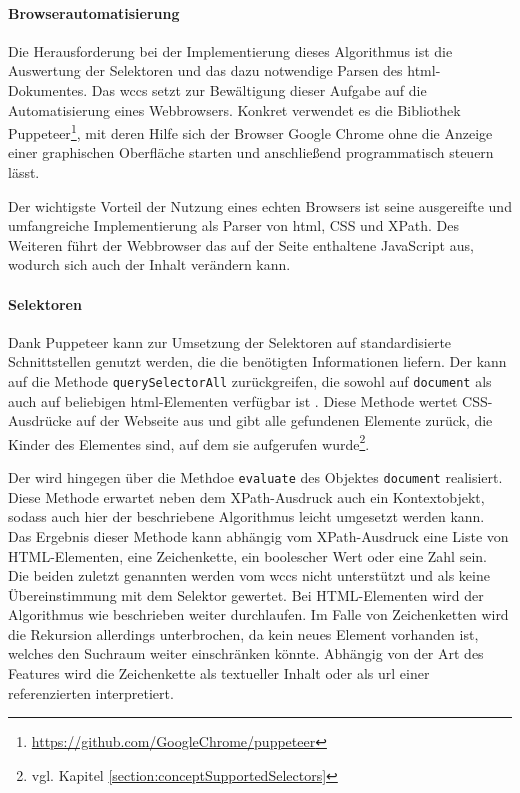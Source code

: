     \paragraph{Browserautomatisierung}
    Die Herausforderung bei der Implementierung dieses Algorithmus
    ist die Auswertung der Selektoren und das dazu notwendige Parsen des \gls{html}-Dokumentes.
    Das \gls{wccs} setzt zur Bewältigung dieser Aufgabe auf die Automatisierung eines Webbrowsers.
    Konkret verwendet es die Bibliothek
    Puppeteer\footnote{\url{https://github.com/GoogleChrome/puppeteer}},
    mit deren Hilfe sich der Browser Google Chrome ohne die Anzeige einer graphischen Oberfläche starten
    und anschließend programmatisch steuern lässt.

    Der wichtigste Vorteil der Nutzung eines echten Browsers ist seine ausgereifte und umfangreiche Implementierung
    als Parser von \gls{html}, CSS und XPath.
    Des Weiteren führt der Webbrowser das auf der Seite enthaltene JavaScript aus,
    wodurch sich auch der Inhalt verändern kann.

    \paragraph{Selektoren}
    Dank Puppeteer kann zur Umsetzung der Selektoren auf standardisierte Schnittstellen
    genutzt werden, die die benötigten Informationen liefern.
    Der {\cssSelector} kann auf die Methode \texttt{querySelectorAll} zurückgreifen,
    die sowohl auf \texttt{document} als auch auf beliebigen \gls{html}-Elementen verfügbar ist
    \cite[Kapitel 6.1]{w3c:selectorsAPI}.
    Diese Methode wertet CSS-Ausdrücke auf der Webseite aus und gibt alle gefundenen Elemente zurück,
    die Kinder des Elementes sind, auf dem sie aufgerufen
    wurde\footnote{vgl. Kapitel \ref{section:conceptSupportedSelectors}}.

    Der {\xpathSelector} wird hingegen über die Methdoe \texttt{evaluate} des Objektes \texttt{document} realisiert.
    Diese Methode erwartet neben dem XPath-Ausdruck auch ein Kontextobjekt,
    sodass auch hier der beschriebene Algorithmus leicht umgesetzt werden kann.
    Das Ergebnis dieser Methode kann abhängig vom XPath-Ausdruck eine Liste von HTML-Elementen, eine Zeichenkette,
    ein boolescher Wert oder eine Zahl sein.
    Die beiden zuletzt genannten werden vom \gls{wccs} nicht unterstützt und als keine Übereinstimmung mit dem Selektor gewertet.
    Bei HTML-Elementen wird der Algorithmus wie beschrieben weiter durchlaufen.
    Im Falle von Zeichenketten wird die Rekursion allerdings unterbrochen, da kein neues Element vorhanden ist,
    welches den Suchraum weiter einschränken könnte.
    Abhängig von der Art des Features wird die Zeichenkette als textueller Inhalt
    oder als \gls{url} einer referenzierten {\resource} interpretiert.

